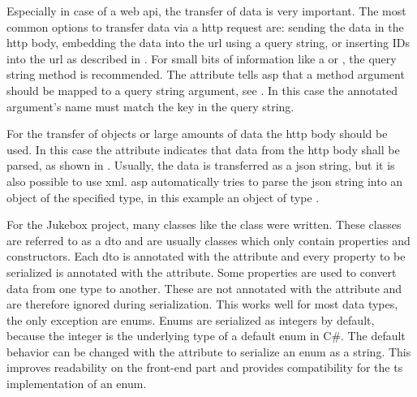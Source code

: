 
Especially in case of a web \gls{api}, the transfer of data is very important. The most common options to transfer data via a \gls{http} request are: sending the data in the \gls{http} body, embedding the data into the \gls{url} using a query string, or inserting IDs into the \gls{url} as described in . For small bits of information like a  or , the query string method is recommended. The \lstcode{[FromQuery]} attribute tells \gls{asp} that a method argument should be mapped to a query string argument, see . In this case the annotated argument's name must match the key in the query string.

For the transfer of objects or large amounts of data the \gls{http} body should be used. In this case the \lstcode{[FromBody]} attribute indicates that data from the \gls{http} body shall be parsed, as shown in . Usually, the data is transferred as a \gls{json} string, but it is also possible to use \gls{xml}. \gls{asp} automatically tries to parse the \gls{json} string into an object of the specified type, in this example an object of type .


For the Jukebox project, many classes like the  class were written. These classes are referred to as a \gls{dto} and are usually  classes which only contain properties and constructors. Each \gls{dto} is annotated with the \lstcode{[DataContract]} attribute and every property to be serialized is annotated with the \lstcode{[DataMember]} attribute. Some properties are used to convert data from one type to another. These are not annotated with the \lstcode{[DataMember]} attribute and are therefore ignored during serialization. This works well for most data types, the only exception are enums. Enums are serialized as integers by default, because the integer is the underlying type of a default enum in C\#. The default behavior can be changed with the  attribute to serialize an enum as a string. This improves readability on the front-end part and provides compatibility for the \gls{ts} implementation of an enum. \cite{mvcModelBinding}


